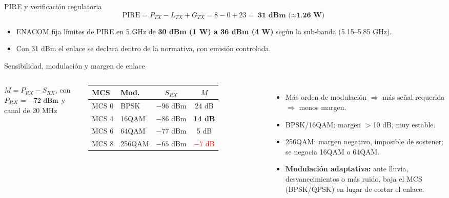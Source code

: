 \begin{frame}{PIRE y verificación regulatoria}
  \[
    \text{PIRE} = P_{TX} - L_{TX} + G_{TX} = 8 - 0 + 23 = \textbf{31 dBm ($\approx$1.26 W)}
  \]
  \begin{itemize}
    \item ENACOM fija límites de PIRE en 5 GHz de \textbf{30 dBm (1 W) a 36 dBm (4 W)}
          según la sub-banda (5.15--5.85 GHz).
    \item Con 31 dBm el enlace se declara dentro de la normativa, con emisión controlada.
  \end{itemize}
\end{frame}

\begin{frame}{Sensibilidad, modulación y margen de enlace}
  \begin{columns}[T]
    \small
    $M = P_{RX} - S_{RX}$, con $P_{RX}=\text{$-72$ dBm}$ y canal de 20 MHz\\[4pt]
    \begin{tabular}{@{}llcc@{}}
      \toprule
      \textbf{MCS} & \textbf{Mod.} & $S_{RX}$ & $M$ \\ \midrule
      MCS 0 & BPSK   & $-96$ dBm & 24 dB \\
      MCS 4 & 16QAM  & $-86$ dBm & \textcolor{verde}{\textbf{14 dB}} \\
      MCS 6 & 64QAM  & $-77$ dBm & 5 dB \\
      MCS 8 & 256QAM & $-65$ dBm & \textcolor{red}{$-7$ dB} \\
      \bottomrule
    \end{tabular}
    \small
    \begin{itemize}
      \item Más orden de modulación $\Rightarrow$ más señal requerida $\Rightarrow$ menos margen.
      \item BPSK/16QAM: margen $>$10 dB, muy estable.
      \item 256QAM: margen negativo, imposible de sostener; se negocia 16QAM o 64QAM.
      \item \textbf{Modulación adaptativa:} ante lluvia, desvanecimientos o más ruido, baja el
            MCS (BPSK/QPSK) en lugar de cortar el enlace.
    \end{itemize}
  \end{columns}
\end{frame}


